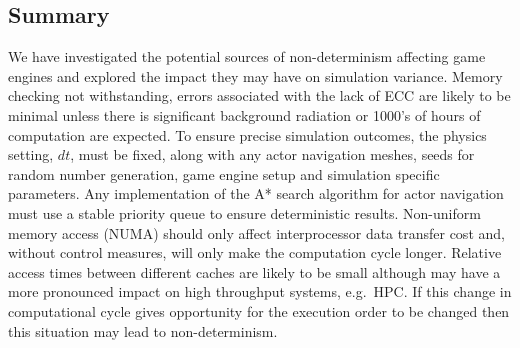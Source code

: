 \DIFdelbegin {}%



\DIFdelend \subsection{Summary}
We have investigated the potential sources of non-determinism affecting game engines and explored the impact they may have on simulation variance. Memory checking not withstanding, errors associated with the lack of ECC are likely to be minimal unless there is significant background radiation or 1000's of hours of computation are expected. To ensure precise simulation outcomes, the physics setting, $dt$, must be fixed, along with any actor navigation meshes, seeds for random number generation, game engine setup and simulation specific parameters. %
%
Any implementation of the A* search algorithm for actor navigation must use a stable priority queue to ensure deterministic results. 
%
Non-uniform memory access (NUMA) should only affect interprocessor data transfer cost and, without control measures, will only make the computation cycle longer. Relative access times between different caches are likely to be small although may have a more pronounced impact on high throughput systems, e.g.\ HPC. If this change in computational cycle gives opportunity for the execution order to be changed then this situation may lead to non-determinism. 


